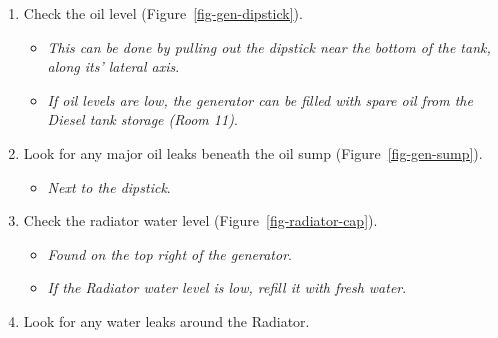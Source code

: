 \documentclass[
  letterpaper,
  DIV=11,
  numbers=noendperiod]{scrreprt}
\providecommand{\tightlist}{%
  \setlength{\itemsep}{0pt}\setlength{\parskip}{0pt}}\usepackage{longtable,booktabs,array}
\begin{document}
\begin{enumerate}
\def\labelenumi{\arabic{enumi}.}
\tightlist
\item
  Check the oil level (Figure~\ref{fig-gen-dipstick}).

  \begin{itemize}
  \tightlist
  \item
    \emph{This can be done by pulling out the dipstick near the bottom
    of the tank, along its' lateral axis}.
  \item
    \emph{If oil levels are low, the generator can be filled with spare
    oil from the Diesel tank storage (Room 11)}.
  \end{itemize}
\item
  Look for any major oil leaks beneath the oil sump
  (Figure~\ref{fig-gen-sump}).

  \begin{itemize}
  \tightlist
  \item
    \emph{Next to the dipstick}.
  \end{itemize}
\item
  Check the radiator water level (Figure~\ref{fig-radiator-cap}).

  \begin{itemize}
  \tightlist
  \item
    \emph{Found on the top right of the generator}.
  \item
    \emph{If the Radiator water level is low, refill it with fresh
    water}.
  \end{itemize}
\item
  Look for any water leaks around the Radiator.
\end{enumerate}
\end{document}
